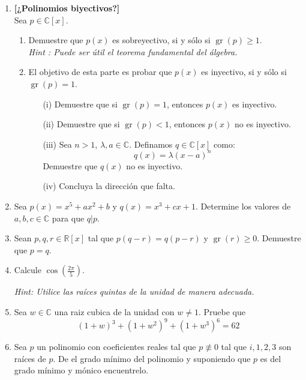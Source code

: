 \documentclass[letterpaper,10pt]{article}
\newcommand{\R}{\mathbb R}
\newcommand{\C}{\mathbb C}
\DeclareMathOperator{\gr}{gr}
\theoremstyle{plain}
\begin{document}
\begin{enumerate}[\bf P1.]
    \item \textbf{[¿Polinomios biyectivos?]} \\
    Sea $p \in \C[x]$.
    \begin{enumerate}
    	\item Demuestre que $p(x)$ es sobreyectivo, si y sólo si $\gr(p)\geq 1$. \\
    	\emph{Hint : Puede ser útil el teorema fundamental del álgebra.}
    	\item El objetivo de esta parte es probar que $p(x)$ es inyectivo, si y sólo si $\gr(p)=1$. 
    	\begin{enumerate}
    		\item[(i)] Demuestre que si $\gr(p)=1$, entonces $p(x)$ es inyectivo.
    		\item[(ii)] Demuestre que si $\gr(p)<1$, entonces $p(x)$ no es inyectivo.	
    		\item[(iii)] Sea $n>1$, $\lambda,a \in \C$. Definamos $q\in \C [x] $ como:
    		$$
    		q(x)=\lambda (x-a)^n
    		$$
    		Demuestre que $q(x)$ no es inyectivo.
    		\item[(iv)] Concluya la dirección que falta.
    	\end{enumerate}
    	\end{enumerate}
    
    \item Sea $p(x)=x^5+ax^2+b$ y $q(x)=x^3+cx+1$. Determine los valores de $a,b,c \in \C$ para que $q|p$.
	\item Sean $p, q,r \in \R[x]$ tal que $p(q-r) =q(p-r)$ y $\gr(r)\geq 0$. Demuestre que $p=q$.
    
    \item Calcule
	$
	\displaystyle\cos \left(\frac{2\pi}{5}  \right)
	$.
	
	\emph{Hint: Utilice las raíces quintas de la unidad de manera adecuada.}
	\item Sea $w\in \C$ una raiz cubica de la unidad con $w\neq 1$. Pruebe que
    $$ (1+w)^{3}+(1+w^{2})^{9}+(1+w^{3})^6=62 $$
    
    \item Sea $p$ un polinomio con coeficientes reales tal que $p \not \equiv 0$ tal que $i, 1,2,3$ son raíces de $p$. De el grado mínimo del polinomio y suponiendo que $p$ es del grado mínimo y mónico encuentrelo.
    
    
\end{enumerate}
\end{document}
